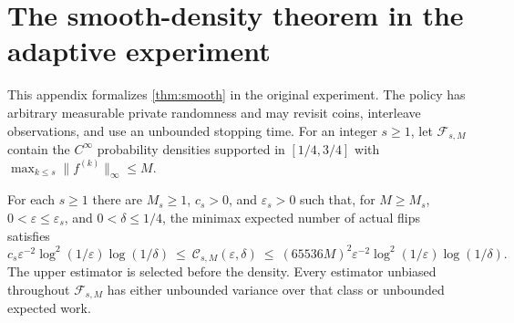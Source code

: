 \section{The smooth-density theorem in the adaptive experiment}
\label{app:smooth-density}

This appendix formalizes \cref{thm:smooth} in the original experiment.
The policy has arbitrary measurable private randomness and may revisit
coins, interleave observations, and use an unbounded stopping time.
For an integer $s\ge1$, let $\mathcal F_{s,M}$ contain the $C^\infty$
probability densities supported in $[1/4,3/4]$ with
$\max_{k\le s}\|f^{(k)}\|_\infty\le M$.

\begin{theorem}
\label{thm:smooth-verified}
For each $s\ge1$ there are $M_s\ge1$, $c_s>0$, and $\varepsilon_s>0$
such that, for $M\ge M_s$, $0<\varepsilon\le\varepsilon_s$, and
$0<\delta\le1/4$, the minimax expected number of actual flips satisfies
\[
 c_s\varepsilon^{-2}\log^2(1/\varepsilon)\log(1/\delta)
 \ \le\ \mathcal C_{s,M}(\varepsilon,\delta)
 \ \le\ (65536M)^2\varepsilon^{-2}\log^2(1/\varepsilon)\log(1/\delta).
\]
The upper estimator is selected before the density.
Every estimator unbiased throughout $\mathcal F_{s,M}$ has either
unbounded variance over that class or unbounded expected work.
\end{theorem}

